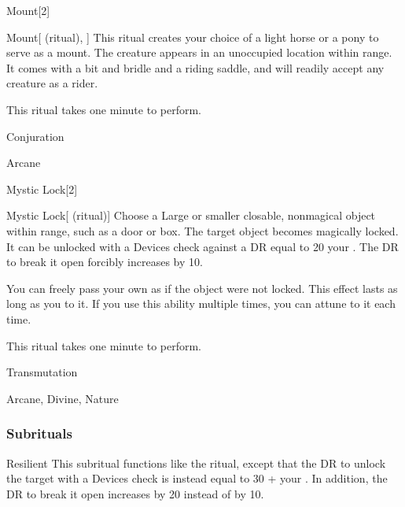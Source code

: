 \begin{spellsection}{Mount}[2]


\begin{ability}{Mount}[ (ritual), ]
This ritual creates your choice of a light horse or a pony to serve as a mount.
The creature appears in an unoccupied location within \rngclose range.
It comes with a bit and bridle and a riding saddle, and will readily accept any creature as a rider.

This ritual takes one minute to perform.
\end{ability}




 Conjuration

 Arcane
\end{spellsection}


\begin{spellsection}{Mystic Lock}[2]


\begin{ability}{Mystic Lock}[ (ritual)]
Choose a Large or smaller closable, nonmagical object within \rngclose range, such as a door or box.
The target object becomes magically locked.
It can be unlocked with a Devices check against a DR equal to 20 \add your .
The DR to break it open forcibly increases by 10.

You can freely pass your own  as if the object were not locked.
This effect lasts as long as you  to it.
If you use this ability multiple times, you can attune to it each time.

This ritual takes one minute to perform.
\end{ability}




 Transmutation

 Arcane, Divine, Nature
\end{spellsection}


\subsubsection{Subrituals}


\begin{ability}[\nth{4}]{Resilient}
This subritual functions like the  ritual, except that the DR to unlock the target with a Devices check is instead equal to 30 + your .
In addition, the DR to break it open increases by 20 instead of by 10.
\end{ability}
\vspace{0.25em}


